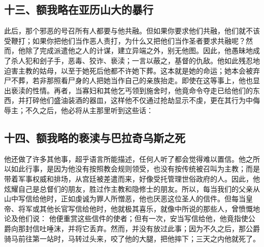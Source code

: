 
\subsection{十三、额我略在亚历山大的暴行}

此后，那个邪恶的号召所有人都要与他共融。但如果你要求他们共融，他们就不该受鞭打；如果你把他们当作恶人责打，为什么又把他们当作圣者要求共融呢？然而，他除了完成派遣他之人的计谋，建立异端之外，别无他图。因此，他愚昧地成了杀人犯和刽子手，恶毒、狡诈、亵渎；一言以蔽之，基督的仇敌。他如此残忍地迫害主教的姑母，以至于她死后他都不许她下葬。这本就是她的命运；她本会被弃尸不葬，若非那照看尸身的人把她当作自己的亲族抬走。即使在这等事上，他也显出亵渎的性情。再者，当寡妇和其他乞丐领到施舍时，他竟命令夺走已给他们的东西，并打碎他们盛油装酒的器皿，这样他不仅通过抢劫显示不虔，更在其行为中侮辱主；不久之后，他必将从主那里听到这些话：\par


\subsection{十四、额我略的亵渎与巴拉奇乌斯之死}

他还做了许多其他事，超乎语言所能描述，任何人听了都会觉得难以置信。他之所以如此行事，是因为他没有按照教会规则领受，也没有按传统被召叫为主教；而是带着军事权威和排场，从宫廷被差遣而来，好像受托管理世俗政府的人。因此，他炫耀自己是总督们的朋友，胜过作主教和隐修士的朋友。所以，每当我们的父亲从山中写信给他时，正如虔诚为罪人所憎恶，他也厌恶这位圣人的信件。但每当皇帝、将军或其他长官写信给他时，他就极其喜乐，就像中所说的那些人，曾愤慨地论及他们说： 他便重赏这些信件的使者；但有一次，安当写信给他，他竟指使公爵向那封信吐唾沫，并将它丢弃。然而，并没有放过此事；因为不久之后，那公爵骑马前往第一站时，马转过头来，咬了他的大腿，把他摔下；三天之内他就死了。\par


